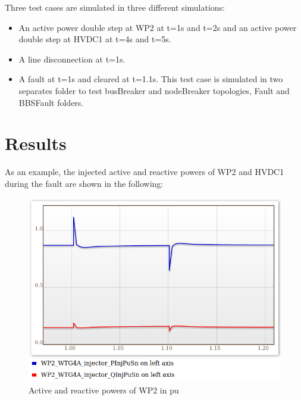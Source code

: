 \documentclass[a4paper, 12pt]{report}
\begin{document}
\par Three test cases are simulated in three different simulations:

\begin{itemize}
\item An active power double step at WP2 at t=1s and t=2s and an active power double step at HVDC1 at t=4s and t=5s.
\item A line disconnection at t=1s.
\item A fault at t=1s and cleared at t=1.1s. This test case is simulated in two separates folder to test busBreaker and nodeBreaker topologies, Fault and BBSFault folders.
\end{itemize}

\section{Results}

\par As an example, the injected active and reactive powers of WP2 and HVDC1 during the fault are shown in the following:

\begin{figure}[H]
  \includegraphics[width=\textwidth]{PQWP2.png}
  \caption{Active and reactive powers of WP2 in pu}
\end{figure}
\end{document}

